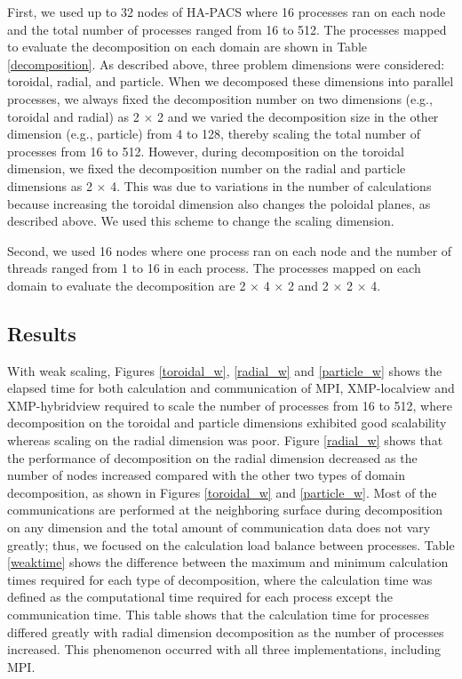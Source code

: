 First, we used up to 32 nodes of HA-PACS where 16 processes ran on each node and the total number of processes ranged from 16 to 512. The processes mapped to evaluate the decomposition on each domain are shown in Table \ref{decomposition}. As described above, three problem dimensions were considered: toroidal, radial, and particle. When we decomposed these dimensions into parallel processes, we always fixed the decomposition number on two dimensions (e.g., toroidal and radial) as 2 $\times$ 2 and we varied the decomposition size in the other dimension (e.g., particle) from 4 to 128, thereby scaling the total number of processes from 16 to 512. However, during decomposition on the toroidal dimension, we fixed the decomposition number on the radial and particle dimensions as 2 $\times$ 4. This was due to variations in the number of calculations because increasing the toroidal dimension also changes the poloidal planes, as described above. We used this scheme to change the scaling dimension. 

Second, we used 16 nodes where one process ran on each node and the number of threads ranged from 1 to 16 in each process.  The processes mapped on each domain to evaluate the decomposition are 2 $\times$ 4 $\times$ 2 and 2 $\times$ 2 $\times$ 4.


\subsection{Results}
With weak scaling, Figures \ref{toroidal_w}, \ref{radial_w} and \ref{particle_w} shows the elapsed time for both calculation and communication of MPI, XMP-localview and XMP-hybridview required to scale the number of processes from 16 to 512, where decomposition on the toroidal and particle dimensions exhibited good scalability whereas scaling on the radial dimension was poor. Figure \ref{radial_w} shows that the performance of decomposition on the radial dimension decreased as the number of nodes increased compared with the other two types of domain decomposition, as shown in Figures \ref{toroidal_w} and \ref{particle_w}. Most of the communications are performed at the neighboring surface during decomposition on any dimension and the total amount of communication data does not vary greatly; thus, we focused on the calculation load balance between processes. Table \ref{weaktime} shows the difference between the maximum and minimum calculation times required for each type of decomposition, where the calculation time was defined as the computational time required for each process except the communication time. This table shows that the calculation time for processes differed greatly with radial dimension decomposition as the number of processes increased. This phenomenon occurred with all three implementations, including MPI.

